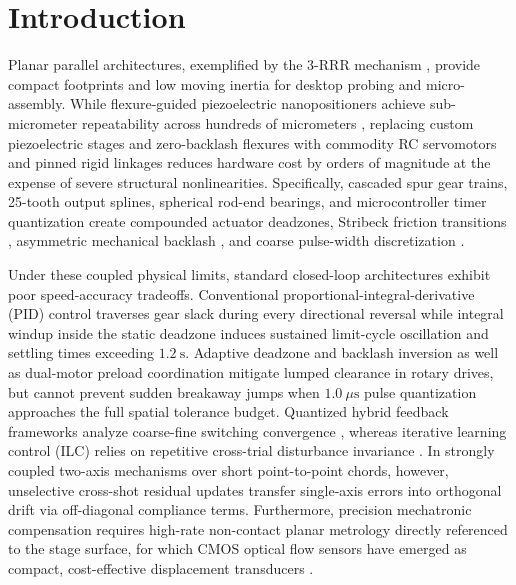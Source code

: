 \documentclass[journal]{IEEEtran}
\begin{document}
\section{Introduction}

Planar parallel architectures, exemplified by the 3-RRR mechanism \cite{merlet2006parallel,gosselin1988optimum}, provide compact footprints and low moving inertia for desktop probing and micro-assembly. While flexure-guided piezoelectric nanopositioners achieve sub-micrometer repeatability across hundreds of micrometers \cite{polit2011development,yang2022long,lyu2023design,riviere2003toward}, replacing custom piezoelectric stages and zero-backlash flexures with commodity RC servomotors and pinned rigid linkages reduces hardware cost by orders of magnitude at the expense of severe structural nonlinearities. Specifically, cascaded spur gear trains, 25-tooth output splines, spherical rod-end bearings, and microcontroller timer quantization create compounded actuator deadzones, Stribeck friction transitions \cite{armstrong1994survey,canudas1995new,olsson1998friction}, asymmetric mechanical backlash \cite{tao1996adaptive,nordin2002controlling,sun2023dual}, and coarse pulse-width discretization \cite{liberzon2003hybrid}.

Under these coupled physical limits, standard closed-loop architectures exhibit poor speed-accuracy tradeoffs. Conventional proportional-integral-derivative (PID) control traverses gear slack during every directional reversal while integral windup inside the static deadzone induces sustained limit-cycle oscillation and settling times exceeding $1.2\ \text{s}$. Adaptive deadzone and backlash inversion \cite{tao1996adaptive,nordin2002controlling} as well as dual-motor preload coordination \cite{sun2023dual} mitigate lumped clearance in rotary drives, but cannot prevent sudden breakaway jumps when $1.0\ \mu\text{s}$ pulse quantization approaches the full spatial tolerance budget. Quantized hybrid feedback frameworks analyze coarse-fine switching convergence \cite{liberzon2003hybrid}, whereas iterative learning control (ILC) relies on repetitive cross-trial disturbance invariance \cite{bristow2006survey}. In strongly coupled two-axis mechanisms over short point-to-point chords, however, unselective cross-shot residual updates transfer single-axis errors into orthogonal drift via off-diagonal compliance terms. Furthermore, precision mechatronic compensation requires high-rate non-contact planar metrology directly referenced to the stage surface, for which CMOS optical flow sensors have emerged as compact, cost-effective displacement transducers \cite{yan2023sea}.
\end{document}
